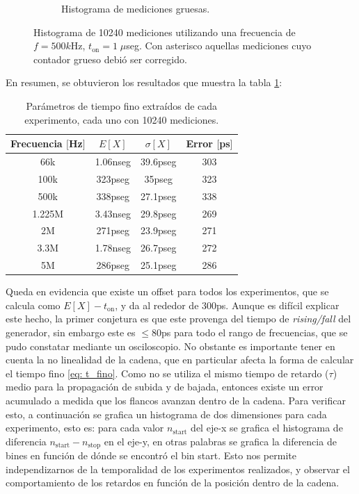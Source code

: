 \begin{figure}[H]
\begin{subfigure}[t]{0.45\textwidth}
{           }
           \caption{Histograma de mediciones gruesas.}
     \end{subfigure}
     \caption{Histograma de 10240 mediciones utilizando una frecuencia de $f=500k$Hz, $t_{\text{on}}=1 \; \mu$seg. 
     Con asterisco aquellas mediciones cuyo contador grueso debió ser corregido.}
\end{figure}

En resumen, se obtuvieron los resultados que muestra la tabla \ref{tabla: res_med_1}:
\begin{table}[!htpb]
     \centering
     \begin{tabular}{cccc}
     \hline
     Frecuencia $[$Hz$]$ & $E[X]$   & $ \sigma[X]$ & Error $[$ps$]$ \\ \hline
     66k                & 1.06nseg & 39.6pseg     & 303            \\ \hline
     100k               & 323pseg  & 35pseg       & 323            \\ \hline
     500k               & 338pseg  & 27.1pseg     & 338            \\ \hline
     1.225M             & 3.43nseg & 29.8pseg     & 269            \\ \hline
     2M                 & 271pseg  & 23.9pseg     & 271            \\ \hline
     3.3M               & 1.78nseg & 26.7pseg     & 272            \\ \hline
     5M                 & 286pseg  & 25.1pseg     & 286            \\ \hline
     \end{tabular}
     \caption{Parámetros de tiempo fino extraídos de cada experimento, cada uno con 10240 mediciones.}
     \label{tabla: res_med_1}
\end{table}


Queda en evidencia que existe un offset para todos los experimentos,
que se calcula como $E[X] - t_\text{on}$, y da al rededor de $300$ps. Aunque es difícil explicar este
hecho, la primer conjetura es que este provenga del tiempo de \textit{rising/fall} del generador,
sin embargo este es $\leq 80$ps para todo el rango de frecuencias, que se pudo constatar mediante un osciloscopio.
No obstante es importante tener en cuenta la no linealidad de la cadena, que en particular afecta
la forma de calcular el tiempo fino \ref{eq: t_fino}. Como no se utiliza el mismo tiempo de retardo ($\tau$) medio
para la propagación de subida y de bajada, entonces existe un error acumulado a medida que los flancos avanzan dentro
de la cadena. Para verificar esto, a continuación se grafica un histograma de dos dimensiones para cada experimento, esto es:
para cada valor $n_\text{start}$ del eje-x se grafica el histograma de diferencia $n_\text{start}-n_\text{stop}$ en el eje-y,
en otras palabras se grafica la diferencia de bines en función de dónde se encontró el bin start. Esto nos permite independizarnos
de la temporalidad de los experimentos realizados, y observar el comportamiento de los retardos en función de la posición
dentro de la cadena. 

